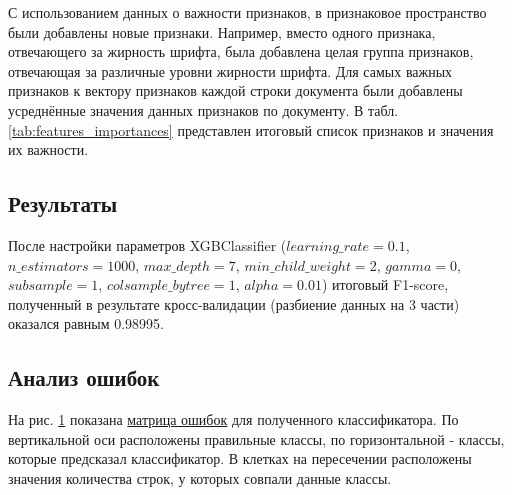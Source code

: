 \documentclass{ProcISPRAS}
\begin{document}
С использованием данных о важности признаков, в признаковое пространство были добавлены новые признаки. Например, вместо одного признака, отвечающего за жирность шрифта, была добавлена целая группа признаков, отвечающая за различные уровни жирности шрифта. Для самых важных признаков к вектору признаков каждой строки документа были добавлены усреднённые значения данных признаков по документу. В табл. \ref{tab:features_importances} представлен итоговый список признаков и значения их важности.

\subsection{Результаты}

После настройки параметров XGBClassifier \cite{tuning} ($learning\_rate=0.1$, $n\_estimators=1000$, $max\_depth=7$, $min\_child\_weight=2$,
$gamma=0$, $subsample=1$, $colsample\_bytree=1$, $alpha=0.01$) итоговый F1-score, полученный в результате кросс-валидации (разбиение данных на 3 части) оказался равным 0.98995. 

\subsection{Анализ ошибок}

На рис. \ref{fig:confusion_matrix} показана \href{https://en.wikipedia.org/wiki/Confusion_matrix}{матрица ошибок} для полученного классификатора. По вертикальной оси расположены правильные классы, по горизонтальной - классы, которые предсказал классификатор. В клетках на пересечении расположены значения количества строк, у которых совпали данные классы.

\begin{figure}[ht]
    \label{fig:confusion_matrix}
\end{figure}
\end{document}
